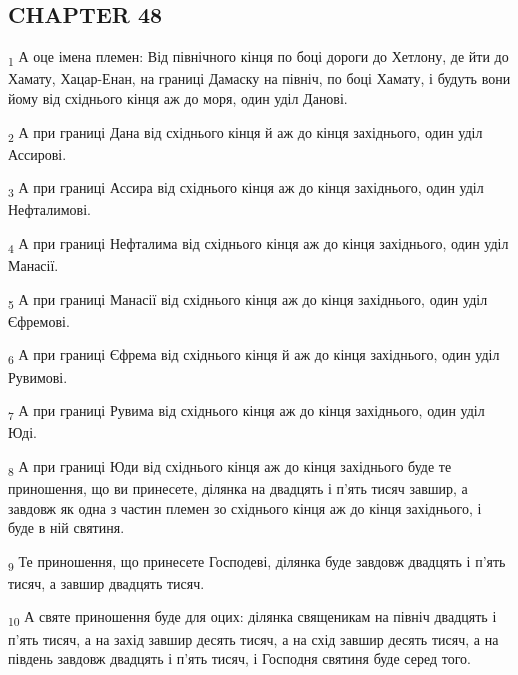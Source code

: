 \subsection{CHAPTER 48}
\begin{tcolorbox}
\textsubscript{1} А оце імена племен: Від північного кінця по боці дороги до Хетлону, де йти до Хамату, Хацар-Енан, на границі Дамаску на північ, по боці Хамату, і будуть вони йому від східнього кінця аж до моря, один уділ Данові.
\end{tcolorbox}
\begin{tcolorbox}
\textsubscript{2} А при границі Дана від східнього кінця й аж до кінця західнього, один уділ Ассирові.
\end{tcolorbox}
\begin{tcolorbox}
\textsubscript{3} А при границі Ассира від східнього кінця аж до кінця західнього, один уділ Нефталимові.
\end{tcolorbox}
\begin{tcolorbox}
\textsubscript{4} А при границі Нефталима від східнього кінця аж до кінця західнього, один уділ Манасії.
\end{tcolorbox}
\begin{tcolorbox}
\textsubscript{5} А при границі Манасії від східнього кінця аж до кінця західнього, один уділ Єфремові.
\end{tcolorbox}
\begin{tcolorbox}
\textsubscript{6} А при границі Єфрема від східнього кінця й аж до кінця західнього, один уділ Рувимові.
\end{tcolorbox}
\begin{tcolorbox}
\textsubscript{7} А при границі Рувима від східнього кінця аж до кінця західнього, один уділ Юді.
\end{tcolorbox}
\begin{tcolorbox}
\textsubscript{8} А при границі Юди від східнього кінця аж до кінця західнього буде те приношення, що ви принесете, ділянка на двадцять і п'ять тисяч завшир, а завдовж як одна з частин племен зо східнього кінця аж до кінця західнього, і буде в ній святиня.
\end{tcolorbox}
\begin{tcolorbox}
\textsubscript{9} Те приношення, що принесете Господеві, ділянка буде завдовж двадцять і п'ять тисяч, а завшир двадцять тисяч.
\end{tcolorbox}
\begin{tcolorbox}
\textsubscript{10} А святе приношення буде для оцих: ділянка священикам на північ двадцять і п'ять тисяч, а на захід завшир десять тисяч, а на схід завшир десять тисяч, а на південь завдовж двадцять і п'ять тисяч, і Господня святиня буде серед того.
\end{tcolorbox}

